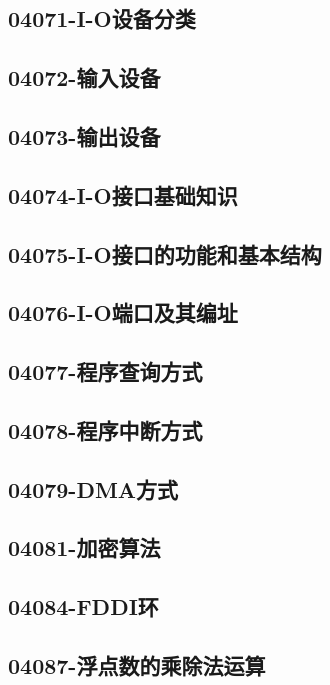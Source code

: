 \subsection{04071-I-O设备分类}

\subsection{04072-输入设备}

\subsection{04073-输出设备}

\subsection{04074-I-O接口基础知识}

\subsection{04075-I-O接口的功能和基本结构}

\subsection{04076-I-O端口及其编址}

\subsection{04077-程序查询方式}

\subsection{04078-程序中断方式}

\subsection{04079-DMA方式}

\subsection{04081-加密算法}

\subsection{04084-FDDI环}

\subsection{04087-浮点数的乘除法运算}

